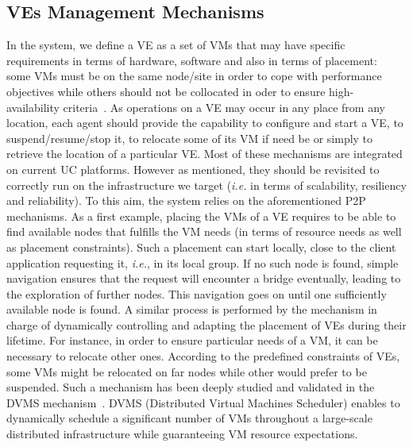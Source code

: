 


\subsection{VEs Management Mechanisms}
\label{ssec:vem}
In the \discovery system, we define a VE as a set of VMs that may have specific
requirements in terms of hardware, software and also in terms of placement:~
some VMs must be on the same node/site in order to cope with performance objectives while
others should not be collocated in oder to ensure
high-availability criteria~\cite{hermenier:2013}.
As operations on a VE may occur in any place from any location, each agent should provide the capability
to configure and start a VE, to suspend/resume/stop it, to relocate some of its VM if need be or simply to retrieve the location of a particular VE. 
Most of these mechanisms are integrated on current UC platforms. However as mentioned, they
should be revisited to correctly run on the infrastructure we target
(\textit{i.e.} in terms of scalability, resiliency and reliability).
To this aim, the \discovery system relies on the aforementioned P2P mechanisms. 
As a first example, placing the VMs of a VE requires to be able to find available nodes that
fulfills the VM needs (in terms of resource needs as well as placement
constraints). Such a placement can start locally, close to the client
application requesting it, \textit{i.e.}, in its local group. If no such node is
found, simple navigation ensures that the request will encounter a bridge
eventually, leading to the exploration of further nodes. This navigation goes
on until one sufficiently available node is found.
A similar process is performed by the mechanism in charge of  dynamically
controlling and adapting the placement of VEs during their lifetime.  For instance, in
order to ensure particular needs of a VM, it can be necessary to relocate other
ones. According to the predefined constraints of VEs, some VMs might be
relocated on far nodes while other would prefer to be suspended.  Such a
mechanism has been deeply studied and validated in the DVMS
mechanism~\cite{dvms:wiki,quesnel:2012}. DVMS (Distributed Virtual
Machines Scheduler) enables to dynamically schedule a significant number of VMs
throughout a large-scale distributed infrastructure while guaranteeing VM
resource expectations.  

